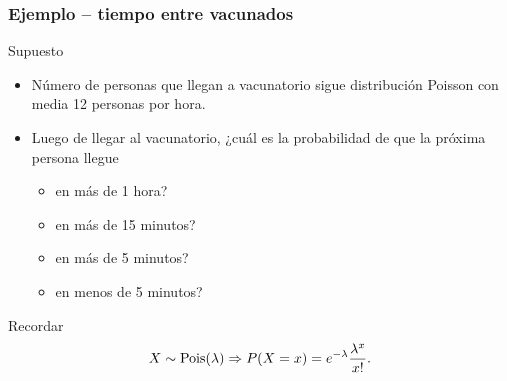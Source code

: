 \documentclass[table]{beamer}
\begin{document}
\begin{frame}
    \frametitle{Ejemplo -- tiempo entre vacunados}
    \begin{block}{Supuesto}
        \begin{itemize}
            \item Número de personas que llegan a vacunatorio sigue distribución Poisson con media 12 personas por hora.
            \item Luego de llegar al vacunatorio, ¿cuál es la probabilidad de que la próxima persona llegue
                \begin{itemize}
                    \item en más de 1 hora?
                    \item en más de 15 minutos?
                    \item en más de 5 minutos?
                    \item en menos de 5 minutos?
                \end{itemize}
        \end{itemize}
    \end{block}
    \begin{block}{Recordar}
        \begin{equation*}
            X \sim \poisson{\lambda} \Rightarrow \prob{X = x} = e^{- \lambda} \frac{\lambda^{x}}{x!} .
        \end{equation*}
    \end{block}
\end{frame}


\end{document}
